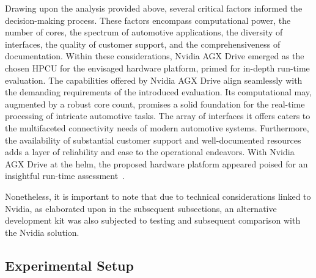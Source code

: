     Drawing upon the analysis provided above,
    several critical factors informed the decision-making process. These factors encompass computational power, the number of cores, the spectrum of automotive applications, the diversity of interfaces, the quality of customer support, and the comprehensiveness of documentation. Within these considerations, Nvidia AGX Drive emerged as the chosen HPCU for the envisaged hardware platform, primed for in-depth run-time evaluation.
    The capabilities offered by Nvidia AGX Drive align seamlessly with the demanding requirements of the introduced evaluation. Its computational may, augmented by a robust core count, promises a solid foundation for the real-time processing of intricate automotive tasks. The array of interfaces it offers caters to the multifaceted connectivity needs of modern automotive systems.
    Furthermore, the availability of substantial customer support and well-documented resources adds a layer of reliability and ease to the operational endeavors. With Nvidia AGX Drive at the helm, the proposed hardware platform appeared poised for an insightful run-time assessment~\cite{9613692,askaripoor2023designer}.


    Nonetheless, it is important to note that due to technical considerations linked to Nvidia, as elaborated upon in the subsequent subsections, an alternative development kit was also subjected to testing and subsequent comparison with the Nvidia solution.

    
    
    \subsection{Experimental Setup}
    
